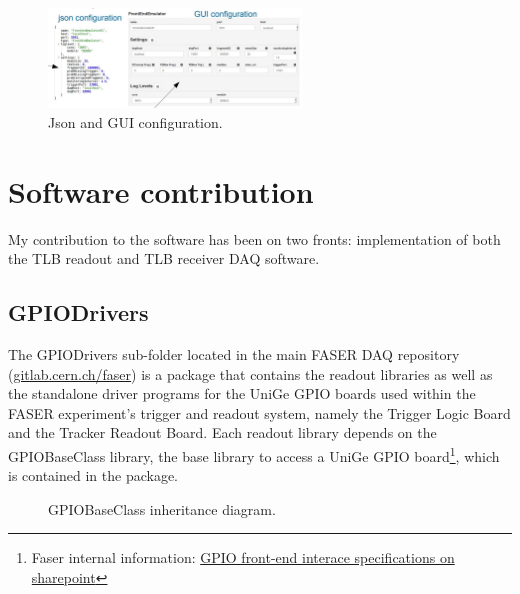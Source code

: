 \begin{figure}[htbp!] 
\centering    
\includegraphics[width=0.6\textwidth]{ChapterDAQ/Figs/GeneralDAQ/configuration.jpg}
\caption{Json and GUI configuration.}
\label{fig:ConfigurationJSON}
\end{figure}


\section{Software contribution}

My contribution to the software has been on two fronts: implementation of both the TLB readout and TLB receiver DAQ software. 

\subsection{GPIODrivers}

The GPIODrivers sub-folder located in the main FASER DAQ repository (\href{https://gitlab.cern.ch/faser}{gitlab.cern.ch/faser}) is a package that contains the readout libraries as well as the standalone driver programs for the UniGe GPIO boards used within the FASER experiment's trigger and readout system, namely the Trigger Logic Board and the Tracker Readout Board. Each readout library depends on the GPIOBaseClass library, the base library to access a UniGe GPIO board\footnote{Faser internal information: \href{https://espace.cern.ch/faser-share/Shared\%20Documents/Trigger,\%20DAQ\%20and\%20DCS/Unige\%20FrontEnd\%20Interface\%20-\%20UFE_Protocol-v1.4.pdf}{GPIO front-end interace specifications on sharepoint}}, which is contained in the package.

\begin{figure}[htbp!]
    \centering
    \caption{GPIOBaseClass inheritance diagram.}
    \label{fig:GPIOBaseClass}
\end{figure}

